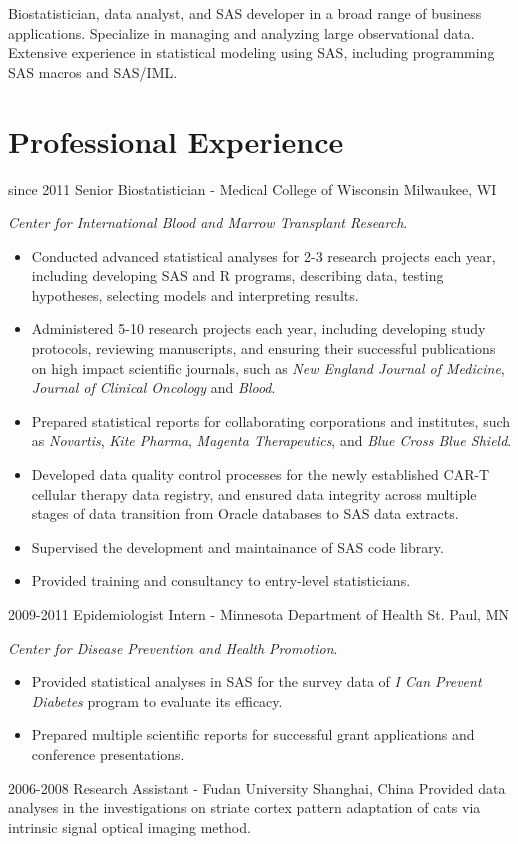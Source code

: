 Biostatistician, data analyst, and SAS developer in a broad range of business applications. Specialize in managing and analyzing large observational data. Extensive experience in statistical modeling using SAS, including programming SAS macros and SAS/IML.\\

\section{Professional Experience}

\begin{entrylist}
  \entry
    {since 2011}
    {Senior Biostatistician - Medical College of Wisconsin}
    {Milwaukee, WI}
    {
    \textit{Center for International Blood and Marrow Transplant Research}.
    \begin{itemize}
      \item Conducted advanced statistical analyses for 2-3 research projects each year, including developing SAS and R programs, describing data, testing hypotheses, selecting models and interpreting results.
      \item Administered 5-10 research projects each year, including developing study protocols, reviewing manuscripts, and ensuring their successful publications on high impact scientific journals, such as \textit{New England Journal of Medicine}, \textit{Journal of Clinical Oncology} and \textit{Blood}.
      \item Prepared statistical reports for collaborating corporations and institutes, such as \textit{Novartis}, \textit{Kite Pharma}, \textit{Magenta Therapeutics}, and \textit{Blue Cross Blue Shield}.
      \item Developed data quality control processes for the newly established CAR-T cellular therapy data registry, and ensured data integrity across multiple stages of data transition from Oracle databases to SAS data extracts.
      \item Supervised the development and maintainance of SAS code library.
      \item Provided training and consultancy to entry-level statisticians.
    \end{itemize}
    }
  \entry
    {2009-2011}
    {Epidemiologist Intern - Minnesota Department of Health}
    {St. Paul, MN}
    {
    \textit{Center for Disease Prevention and Health Promotion}.
    \begin{itemize}
      \item Provided statistical analyses in SAS for the survey data of \textit{I Can Prevent Diabetes} program to evaluate its efficacy.
      \item Prepared multiple scientific reports for successful grant applications and conference presentations.
    \end{itemize}
    }
  \entry
    {2006-2008}
    {Research Assistant - Fudan University}
    {Shanghai, China}
    {Provided data analyses in the investigations on striate cortex pattern adaptation of cats via intrinsic signal optical imaging method.}
\end{entrylist}

